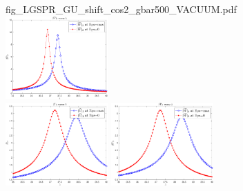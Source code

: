 \documentclass[11pt]{article}
\begin{document}
\begin{figure}[H]
{		{fig_LGSPR_GU_shift_cos2_gbar500_VACUUM.pdf}}
	\quad
	\subfigure 
	{\includegraphics[width=0.35\textwidth]
		{fig_LGSPR_GW_shift_cos2_gbar500_VACUUM.pdf}}
	\\
	\subfigure 
	{\includegraphics[width=0.35\textwidth]
		{fig_LGSPR_GU_shift_cos2_gbar1000_VACUUM.pdf}}
	\quad
	\subfigure 
	{\includegraphics[width=0.35\textwidth]
		{fig_LGSPR_GW_shift_cos2_gbar1000_VACUUM.pdf}}
\end{figure}
\end{document}
